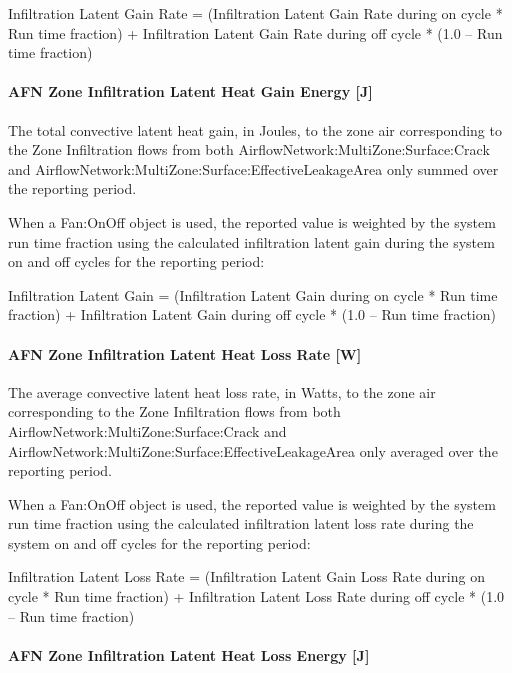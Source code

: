 Infiltration Latent Gain Rate = (Infiltration Latent Gain Rate during on cycle * Run time fraction) + Infiltration Latent Gain Rate during off cycle * (1.0 -- Run time fraction)

\paragraph{AFN Zone Infiltration Latent Heat Gain Energy {[}J{]}}\label{afn-zone-infiltration-latent-heat-gain-energy-j}

The total convective latent heat gain, in Joules, to the zone air corresponding to the Zone Infiltration flows from both AirflowNetwork:MultiZone:Surface:Crack and AirflowNetwork:MultiZone:Surface:EffectiveLeakageArea only  summed over the reporting period.

When a Fan:OnOff object is used, the reported value is weighted by the system run time fraction using the calculated infiltration latent gain during the system on and off cycles for the reporting period:

Infiltration Latent Gain = (Infiltration Latent Gain during on cycle * Run time fraction) + Infiltration Latent Gain during off cycle * (1.0 -- Run time fraction)

\paragraph{AFN Zone Infiltration Latent Heat Loss Rate {[}W{]}}\label{afn-zone-infiltration-latent-heat-loss-rate-w}

The average convective latent heat loss rate, in Watts, to the zone air corresponding to the Zone Infiltration flows from both AirflowNetwork:MultiZone:Surface:Crack and AirflowNetwork:MultiZone:Surface:EffectiveLeakageArea only  averaged over the reporting period.

When a Fan:OnOff object is used, the reported value is weighted by the system run time fraction using the calculated infiltration latent loss rate during the system on and off cycles for the reporting period:

Infiltration Latent Loss Rate = (Infiltration Latent Gain Loss Rate during on cycle * Run time fraction) + Infiltration Latent Loss Rate during off cycle * (1.0 -- Run time fraction)

\paragraph{AFN Zone Infiltration Latent Heat Loss Energy {[}J{]}}\label{afn-zone-infiltration-latent-heat-loss-energy-j}

